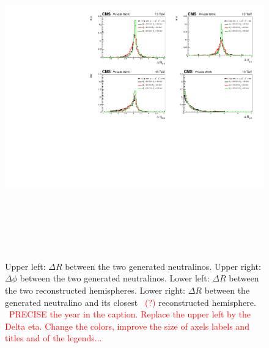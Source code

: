 \documentclass{cernatlasnote}
\begin{document}
\begin{figure}[h]
\centering
\includegraphics[height=14cm, width=17cm, trim= 2cm 0cm 0cm 0.cm,clip]{images/Topology/dPhi_GenGen.pdf}
\caption{\label{fig:dRNEUNEU} Upper left: $\Delta R$ between the two generated neutralinos. Upper right: $\Delta \phi$ between the two generated neutralinos. Lower left: $\Delta R$ between the two reconstructed hemispheres. Lower right: $\Delta R$ between the generated neutralino and its closest ~\textcolor{red}{(?)} reconstructed hemisphere. 
~\textcolor{red}{PRECISE the year in the caption. Replace the upper left by the Delta eta. Change the colors, improve the size of axels labels and titles and of the legends...}
}
\end{figure}
\end{document}
